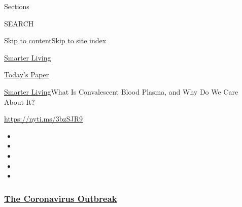 Sections

SEARCH

\protect\hyperlink{site-content}{Skip to
content}\protect\hyperlink{site-index}{Skip to site index}

\href{https://www.nytimes3xbfgragh.onion/section/smarter-living}{Smarter
Living}

\href{https://myaccount.nytimes3xbfgragh.onion/auth/login?response_type=cookie\&client_id=vi}{}

\href{https://www.nytimes3xbfgragh.onion/section/todayspaper}{Today's
Paper}

\href{/section/smarter-living}{Smarter Living}\textbar{}What Is
Convalescent Blood Plasma, and Why Do We Care About It?

\url{https://nyti.ms/3bzSJR9}

\begin{itemize}
\item
\item
\item
\item
\item
\end{itemize}

\hypertarget{the-coronavirus-outbreak}{%
\subsubsection{\texorpdfstring{\href{https://www.nytimes3xbfgragh.onion/news-event/coronavirus?name=styln-coronavirus-national\&region=TOP_BANNER\&block=storyline_menu_recirc\&action=click\&pgtype=Article\&impression_id=d24d9230-f4d2-11ea-bf97-05837a7d0676\&variant=undefined}{The
Coronavirus
Outbreak}}{The Coronavirus Outbreak}}\label{the-coronavirus-outbreak}}

